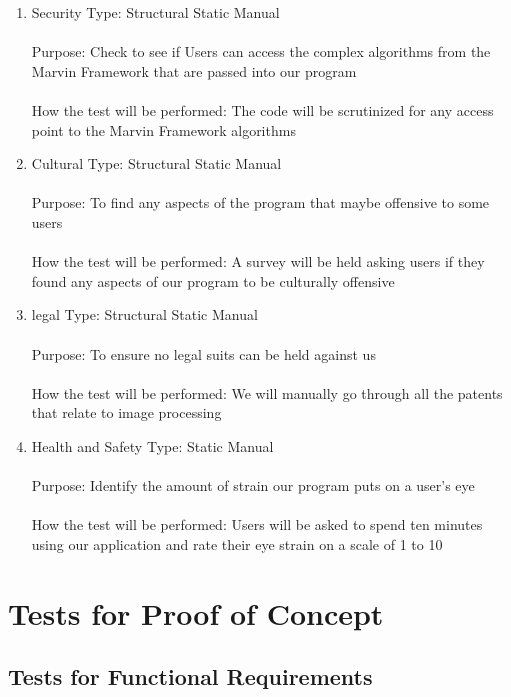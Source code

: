 \documentclass[12pt, titlepage]{article}
\begin{document}
\begin{enumerate}
\item{Security}
Type: Structural Static Manual\\ \\
Purpose: Check to see if Users can access the complex algorithms from the Marvin Framework that are passed into our program\\ \\
How the test will be performed: The code will be scrutinized for any access point to the Marvin Framework algorithms

\item{Cultural}
Type: Structural Static Manual\\ \\
Purpose: To find any aspects of the program that maybe offensive to some users\\ \\
How the test will be performed: A survey will be held asking users if they found any aspects of our program to be culturally offensive

\item{legal}
Type: Structural Static Manual\\ \\
Purpose: To ensure no legal suits can be held against us \\ \\
How the test will be performed: We will manually go through all the patents that relate to image processing

\item{Health and Safety}
Type: Static Manual\\ \\
Purpose: Identify the amount of strain our program puts on a user’s eye\\ \\
How the test will be performed: Users will be asked to spend ten minutes using our application and rate their eye strain on a scale of 1 to 10
 

\end{enumerate}

\section{Tests for Proof of Concept}

\subsection{Tests for Functional Requirements}
		
\end{document}
